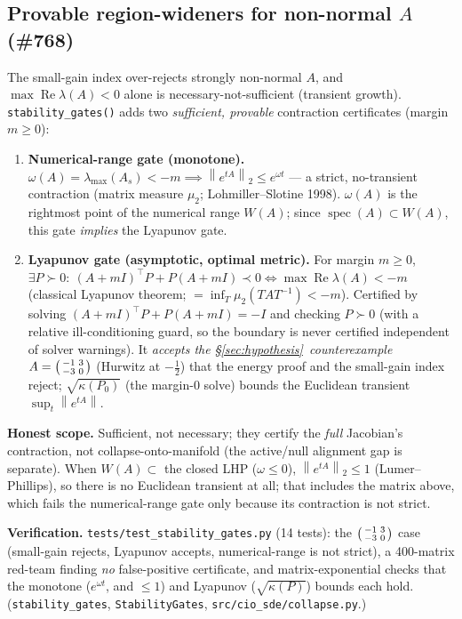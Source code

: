 \documentclass[11pt]{article}
\theoremstyle{definition}
\newcommand{\norm}[1]{\left\lVert#1\right\rVert}
\DeclareMathOperator*{\Real}{Re}
\begin{document}
\subsection{Provable region-wideners for non-normal $A$ (\#768)}
\label{sec:gates768}
The small-gain index over-rejects strongly non-normal $A$, and $\max\Real\lambda(A)<0$
alone is necessary-not-sufficient (transient growth). \texttt{stability\_gates()} adds
two \emph{sufficient, provable} contraction certificates (margin $m\ge0$):
\begin{enumerate}
\item \textbf{Numerical-range gate (monotone).}
  $\omega(A)=\lambda_{\max}(A_s)<-m \implies \norm{e^{tA}}_2\le e^{\omega t}$ --- a
  strict, no-transient contraction (matrix measure $\mu_2$; Lohmiller--Slotine 1998).
  $\omega(A)$ is the rightmost point of the numerical range $W(A)$; since
  $\operatorname{spec}(A)\subset W(A)$, this gate \emph{implies} the Lyapunov gate.
\item \textbf{Lyapunov gate (asymptotic, optimal metric).} For margin $m\ge0$,
  $\exists P\succ0:\ (A+mI)^\top P+P(A+mI)\prec0 \iff \max\Real\lambda(A)<-m$ (classical
  Lyapunov theorem; $=\inf_T\mu_2(TAT^{-1})<-m$). Certified by solving
  $(A+mI)^\top P+P(A+mI)=-I$ and checking $P\succ0$ (with a relative ill-conditioning
  guard, so the boundary is never certified independent of solver warnings). It
  \emph{accepts the \S\ref{sec:hypothesis}~counterexample}
  $A=\begin{psmallmatrix}-1&3\\-3&0\end{psmallmatrix}$ (Hurwitz at $-\tfrac12$) that the
  energy proof and the small-gain index reject; $\sqrt{\kappa(P_0)}$ (the margin-0 solve)
  bounds the Euclidean transient $\sup_t\norm{e^{tA}}$.
\end{enumerate}
\textbf{Honest scope.} Sufficient, not necessary; they certify the \emph{full}
Jacobian's contraction, not collapse-onto-manifold (the active/null alignment gap is
separate). When $W(A)\subset$ the closed LHP ($\omega\le0$), $\norm{e^{tA}}_2\le 1$
(Lumer--Phillips), so there is no Euclidean transient at all; that includes the matrix above, which
fails the numerical-range gate only because its contraction is not strict.
\begin{verifybox}
\textbf{Verification.} \texttt{tests/\allowbreak test\_stability\_gates.py} (14 tests): the
$\begin{psmallmatrix}-1&3\\-3&0\end{psmallmatrix}$ case (small-gain rejects, Lyapunov
accepts, numerical-range is not strict), a 400-matrix red-team finding \emph{no}
false-positive certificate, and matrix-exponential checks that the monotone ($e^{\omega t}$, and
$\le 1$) and Lyapunov ($\sqrt{\kappa(P)}$) bounds each hold.
(\texttt{stability\_gates}, \texttt{StabilityGates}, \texttt{src/cio\_sde/collapse.py}.)
\end{verifybox}
\end{document}
